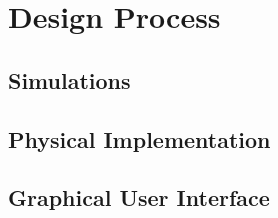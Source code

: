 
\section{Design Process}

\subsection{Simulations}

\subsection{Physical Implementation}


\subsection{Graphical User Interface}

